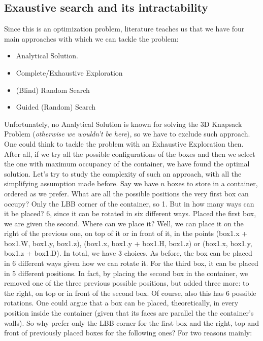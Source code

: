 \documentclass[12pt]{extarticle}
\begin{document}
\subsection{Exaustive search and its intractability}
Since this is an optimization problem, literature teaches us that we have four main approaches with which we can tackle the problem\cite{ai:textbook}:
\begin{itemize}
    \item Analytical Solution.
    \item Complete/Exhaustive Exploration
    \item (Blind) Random Search
    \item Guided (Random) Search
\end{itemize}
Unfortunately, no Analytical Solution is known for solving the 3D Knapsack Problem (\emph{otherwise we wouldn't be here}), so we have to exclude such approach.
\newline One could think to tackle the problem with an Exhaustive Exploration then. After all, if we try all the possible configurations of the boxes and then we select the one with maximum occupancy of the container, we have found the optimal solution. Let's try to study the complexity of such an approach, with all the simplifying assumption made before.
\newline Say we have $n$ boxes to store in a container, ordered as we prefer. What are all the possible positions the very first box can occupy? Only the LBB corner of the container, so 1. But in how many ways can it be placed? 6, since it can be rotated in six different ways.
\newline Placed the first box, we are given the second. Where can we place it? Well, we can place it on the right of the previous one, on top of it or in front of it, in the points (box1.x + box1.W, box1.y, box1.z), (box1.x, box1.y + box1.H, box1.z) or (box1.x, box1.y, box1.z + box1.D). In total, we have 3 choices. As before, the box can be placed in 6 different ways given how we can rotate it.
\newline For the third box, it can be placed in 5 different positions. In fact, by placing the second box in the container, we removed one of the three previous possible positions, but added three more: to the right, on top or in front of the second box. Of course, also this has 6 possible rotations.
\newline One could argue that a box can be placed, theoretically, in every position inside the container (given that its faces are parallel the the container's walls). So why prefer only the LBB corner for the first box and the right, top and front of previously placed boxes for the following ones? For two reasons mainly:
\end{document}
